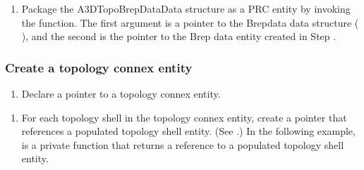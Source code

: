 \documentclass[letterpaper,12pt,english,openany,oneside]{sphinxmanual}
\begin{document}
\begin{sphinxVerbatim}[commandchars=\\\{\}]
 

  
  
\end{sphinxVerbatim}
\begin{enumerate}
%
\setcounter{enumi}{4}
\item {} 
Package the A3DTopoBrepDataData structure as a PRC entity by invoking the  function. The first argument is a pointer to the Brep\sphinxhyphen{}data data structure ( ), and the second is the pointer to the Brep data entity created in Step .

\end{enumerate}

\begin{sphinxVerbatim}[commandchars=\\\{\}]
    
\end{sphinxVerbatim}


\subsubsection{Create a topology connex entity}
\label{\detokenize{Plugins_A3D_API:create-a-topology-connex-entity}}\begin{enumerate}
%
\item {} 
Declare a pointer to a topology connex entity.

\end{enumerate}

\begin{sphinxVerbatim}[commandchars=\\\{\}]
   
\end{sphinxVerbatim}
\begin{enumerate}
%
\setcounter{enumi}{1}
\item {} 
For each topology shell in the topology connex entity, create a pointer that references a populated topology shell entity. (See .) In the following example,  is a private function that returns a reference to a populated topology shell entity.

\end{enumerate}
\end{document}
